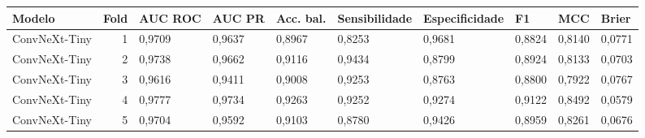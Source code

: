 \begin{tabular}{lrllllllll}
\toprule
Modelo & Fold & AUC ROC & AUC PR & Acc. bal. & Sensibilidade & Especificidade & F1 & MCC & Brier \\
\midrule
ConvNeXt-Tiny & 1 & 0,9709 & 0,9637 & 0,8967 & 0,8253 & 0,9681 & 0,8824 & 0,8140 & 0,0771 \\
ConvNeXt-Tiny & 2 & 0,9738 & 0,9662 & 0,9116 & 0,9434 & 0,8799 & 0,8924 & 0,8133 & 0,0703 \\
ConvNeXt-Tiny & 3 & 0,9616 & 0,9411 & 0,9008 & 0,9253 & 0,8763 & 0,8800 & 0,7922 & 0,0767 \\
ConvNeXt-Tiny & 4 & 0,9777 & 0,9734 & 0,9263 & 0,9252 & 0,9274 & 0,9122 & 0,8492 & 0,0579 \\
ConvNeXt-Tiny & 5 & 0,9704 & 0,9592 & 0,9103 & 0,8780 & 0,9426 & 0,8959 & 0,8261 & 0,0676 \\
\bottomrule
\end{tabular}
